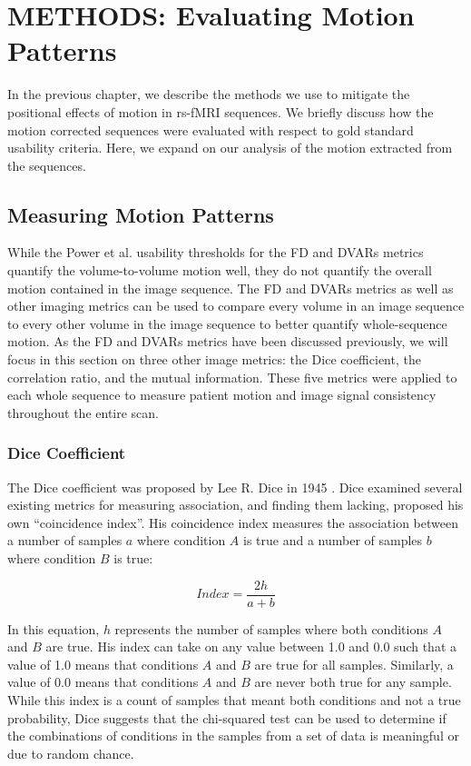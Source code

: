 \chapter{METHODS: Evaluating Motion Patterns}
\label{ch4:mopa}

In the previous chapter, we describe the methods we use to mitigate the positional effects of motion in rs-fMRI sequences. We briefly discuss how the motion corrected sequences were evaluated with respect to gold standard usability criteria. Here, we expand on our analysis of the motion extracted from the sequences.

\section{Measuring Motion Patterns}

While the Power et al. usability thresholds for the FD and DVARs metrics quantify the volume-to-volume motion well, they do not quantify the overall motion contained in the image sequence. The FD and DVARs metrics as well as other imaging metrics can be used to compare every volume in an image sequence to every other volume in the image sequence to better quantify whole-sequence motion. As the FD and DVARs metrics have been discussed previously, we will focus in this section on three other image metrics: the Dice coefficient, the correlation ratio, and the mutual information. These five metrics were applied to each whole sequence to measure patient motion and image signal consistency throughout the entire scan.

\subsection{Dice Coefficient}

The Dice coefficient was proposed by Lee R. Dice in 1945 \cite{Dice1945}. Dice examined several existing metrics for measuring association, and finding them lacking, proposed his own ``coincidence index''. His coincidence index measures the association between a number of samples $a$ where condition $A$ is true and a number of samples $b$ where condition $B$ is true:

\begin{equation}
Index = \frac{2h}{a+b}
\end{equation}

In this equation, $h$ represents the number of samples where both conditions $A$ and $B$ are true. His index can take on any value between 1.0 and 0.0 such that a value of 1.0 means that conditions $A$ and $B$ are true for all samples. Similarly, a value of 0.0 means that conditions $A$ and $B$ are never both true for any sample. While this index is a count of samples that meant both conditions and not a true probability, Dice suggests that the chi-squared test can be used to determine if the combinations of conditions in the samples from a set of data is meaningful or due to random chance. 


